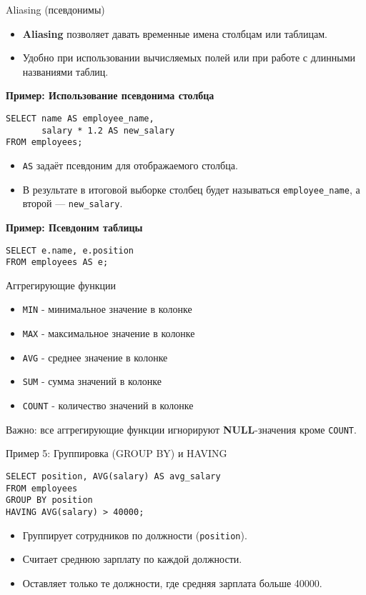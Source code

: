 \documentclass{beamer}
\begin{document}
\begin{frame}[fragile]{Aliasing (псевдонимы)}
	\begin{itemize}
		\item \textbf{Aliasing} позволяет давать временные имена столбцам или таблицам.
		\item Удобно при использовании вычисляемых полей или при работе с длинными названиями таблиц.
	\end{itemize}

	\textbf{Пример: Использование псевдонима столбца}
	\begin{verbatim}
SELECT name AS employee_name,
       salary * 1.2 AS new_salary
FROM employees;
\end{verbatim}
	\begin{itemize}
		\item \texttt{AS} задаёт псевдоним для отображаемого столбца.
		\item В результате в итоговой выборке столбец будет называться \texttt{employee\_name},
		      а второй --- \texttt{new\_salary}.
	\end{itemize}

	\textbf{Пример: Псевдоним таблицы}
	\begin{verbatim}
SELECT e.name, e.position
FROM employees AS e;
\end{verbatim}
\end{frame}

\begin{frame}[fragile]{Аггрегирующие функции}
	\begin{itemize}
		\item \texttt{MIN} - минимальное значение в колонке
		\item \texttt{MAX} - максимальное значение в колонке
		\item \texttt{AVG} - среднее значение в колонке
		\item \texttt{SUM} - сумма значений в колонке
		\item \texttt{COUNT} - количество значений в колонке
	\end{itemize}
	Важно: все аггрегирующие функции игнорируют \textbf{NULL}-значения кроме \texttt{COUNT}.
\end{frame}

\begin{frame}[fragile]{Пример 5: Группировка (GROUP BY) и HAVING}
	\begin{verbatim}
SELECT position, AVG(salary) AS avg_salary
FROM employees
GROUP BY position
HAVING AVG(salary) > 40000;
\end{verbatim}
	\begin{itemize}
		\item Группирует сотрудников по должности (\texttt{position}).
		\item Считает среднюю зарплату по каждой должности.
		\item Оставляет только те должности, где средняя зарплата больше 40000.
	\end{itemize}
\end{frame}
\end{document}
